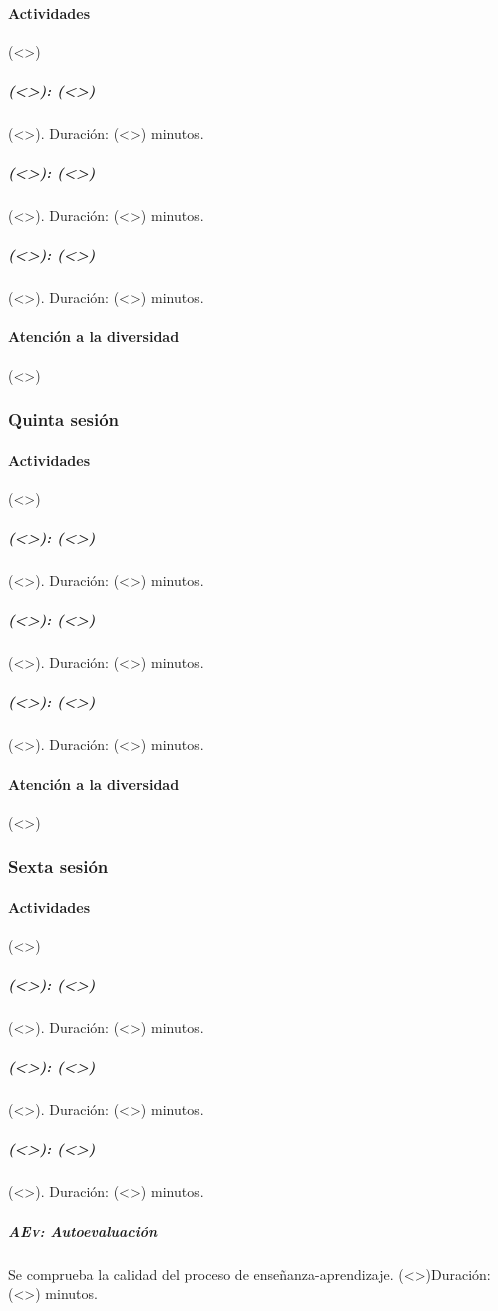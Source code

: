 \documentclass[12pt]{article}
\begin{document}
\paragraph*{Actividades} (<>)

\subparagraph{\textsc{(<>)}: (<>)} (<>). Duración: (<>) minutos.

\subparagraph{\textsc{(<>)}: (<>)} (<>). Duración: (<>) minutos.

\subparagraph{\textsc{(<>)}: (<>)} (<>). Duración: (<>) minutos.

\paragraph{Atención a la diversidad} (<>)

\subsubsection{Quinta sesión}

\paragraph*{Actividades} (<>)

\subparagraph{\textsc{(<>)}: (<>)} (<>). Duración: (<>) minutos.

\subparagraph{\textsc{(<>)}: (<>)} (<>). Duración: (<>) minutos.

\subparagraph{\textsc{(<>)}: (<>)} (<>). Duración: (<>) minutos.

\paragraph{Atención a la diversidad} (<>)

\subsubsection{Sexta sesión}

\paragraph*{Actividades} (<>)

\subparagraph{\textsc{(<>)}: (<>)} (<>). Duración: (<>) minutos.

\subparagraph{\textsc{(<>)}: (<>)} (<>). Duración: (<>) minutos.

\subparagraph{\textsc{(<>)}: (<>)} (<>). Duración: (<>) minutos.

\subparagraph{\textsc{AEv}: Autoevaluación} Se comprueba la calidad del proceso de enseñanza-aprendizaje. (<>)Duración: (<>) minutos.
\end{document}
